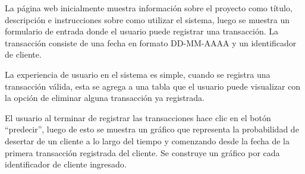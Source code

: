 La página web inicialmente muestra información sobre el proyecto como título, descripción e instrucciones sobre como utilizar el sistema, luego se muestra un formulario de entrada donde el usuario puede registrar una transacción. La transacción consiste de una fecha en formato DD-MM-AAAA y un identificador de cliente. 

La experiencia de usuario en el sistema es simple, cuando se registra una transacción válida, esta se agrega a una tabla que el usuario puede visualizar con la opción de eliminar alguna transacción ya registrada.

El usuario al terminar de registrar las transacciones hace clic en el botón “predecir”, luego de esto se muestra un gráfico que representa la probabilidad de desertar de un cliente a lo largo del tiempo y comenzando desde la fecha de la primera transacción registrada del cliente. Se construye un gráfico por cada identificador de cliente ingresado.